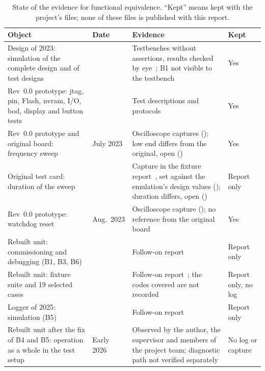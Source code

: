 \begin{table}[htbp]
	\centering
	\caption[State of the Evidence]{State of the evidence for functional equivalence. \enquote{Kept} means kept with the project's files; none of these files is published with this report.}
	\label{tab:evidence_state}
	\small
	\begin{tabular}{@{}>{\raggedright\arraybackslash}p{} >{\raggedright\arraybackslash}p{} >{\raggedright\arraybackslash}p{} >{\raggedright\arraybackslash}p{}@{}}
		\toprule
		Object & Date & Evidence & Kept \\
		\midrule
		Design of 2023: simulation of the complete design and of test designs & 2023 & Testbenches without assertions, results checked by eye~\cite[Sec.~5.1]{leyer2023}; B1 not visible to the testbench & Yes \\
		Rev~0.0 prototype: \gls{jtag}, pin, Flash, \gls{nvram}, I/O, \gls{bod}, display and button tests & 2023 & Test descriptions and protocols~\cite[Sec.~4.1--4.9, App.~A]{leyer2023} & Yes \\
		Rev~0.0 prototype and original board: frequency sweep & July 2023 & Oscilloscope captures (\Cref{fig:sweep_comparison}); low end differs from the original, open (\Cref{subsec:fpga_interface_results}) & Yes \\
		Original test card: duration of the sweep & 2023 & Capture in the fixture report~\cite[Sec.~5.2, Fig.~3]{dolata2023}, set against the emulation's design values (\Cref{sec:fpga_core_details}); duration differs, open (\Cref{subsec:fpga_interface_results}) & Report only \\
		Rev~0.0 prototype: watchdog reset & Aug.\ 2023 & Oscilloscope capture (\Cref{fig:watchdog_reaction}); no reference from the original board & Yes \\
		Rebuilt unit: commissioning and debugging (B1, B3, B6) & 2025 & Follow-on report~\cite[pp.~13--14]{savchuk2025} & Report only \\
		Rebuilt unit: fixture suite and 19 selected cases & 2025 & Follow-on report~\cite[p.~15]{savchuk2025}; the codes covered are not recorded & Report only, no log \\
		Logger of 2025: simulation (B5) & 2025 & Follow-on report~\cite[p.~21]{savchuk2025} & Report only \\
		Rebuilt unit after the fix of B4 and B5: operation as a whole in the test setup & Early 2026 & Observed by the author, the supervisor and members of the project team; diagnostic path not verified separately & No log or capture \\

\end{tabular}
\end{table}
